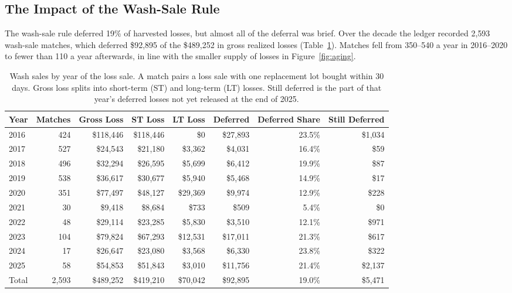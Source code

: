 \subsection{The Impact of the Wash-Sale Rule}
\label{sec:wash}

The wash-sale rule deferred 19\% of harvested losses, but almost all of the deferral was brief. Over the decade the ledger recorded 2{,}593 wash-sale matches, which deferred \$92{,}895 of the \$489{,}252 in gross realized losses (Table~\ref{tab:wash}). Matches fell from 350--540 a year in 2016--2020 to fewer than 110 a year afterwards, in line with the smaller supply of losses in Figure~\ref{fig:aging}.

\begin{table}[!h]
\caption{Wash sales by year of the loss sale. A match pairs a loss sale with one replacement lot bought within 30 days. Gross loss splits into short-term (ST) and long-term (LT) losses. Still deferred is the part of that year's deferred losses not yet released at the end of 2025.}
\label{tab:wash}
\small
\begin{tabular*}{\linewidth}{@{\extracolsep{\fill}}lrrrrrrr@{}}
\toprule
\textsf{\textbf{Year}} & \textsf{\textbf{Matches}} & \textsf{\textbf{Gross Loss}} & \textsf{\textbf{ST Loss}} & \textsf{\textbf{LT Loss}} & \textsf{\textbf{Deferred}} & \textsf{\textbf{Deferred Share}} & \textsf{\textbf{Still Deferred}} \\
\midrule
2016 & 424 & \$118{,}446 & \$118{,}446 & \$0 & \$27{,}893 & 23.5\% & \$1{,}034 \\
2017 & 527 & \$24{,}543 & \$21{,}180 & \$3{,}362 & \$4{,}031 & 16.4\% & \$59 \\
2018 & 496 & \$32{,}294 & \$26{,}595 & \$5{,}699 & \$6{,}412 & 19.9\% & \$87 \\
2019 & 538 & \$36{,}617 & \$30{,}677 & \$5{,}940 & \$5{,}468 & 14.9\% & \$17 \\
2020 & 351 & \$77{,}497 & \$48{,}127 & \$29{,}369 & \$9{,}974 & 12.9\% & \$228 \\
2021 & 30 & \$9{,}418 & \$8{,}684 & \$733 & \$509 & 5.4\% & \$0 \\
2022 & 48 & \$29{,}114 & \$23{,}285 & \$5{,}830 & \$3{,}510 & 12.1\% & \$971 \\
2023 & 104 & \$79{,}824 & \$67{,}293 & \$12{,}531 & \$17{,}011 & 21.3\% & \$617 \\
2024 & 17 & \$26{,}647 & \$23{,}080 & \$3{,}568 & \$6{,}330 & 23.8\% & \$322 \\
2025 & 58 & \$54{,}853 & \$51{,}843 & \$3{,}010 & \$11{,}756 & 21.4\% & \$2{,}137 \\
\midrule
Total & 2{,}593 & \$489{,}252 & \$419{,}210 & \$70{,}042 & \$92{,}895 & 19.0\% & \$5{,}471 \\
\bottomrule
\end{tabular*}
\end{table}


